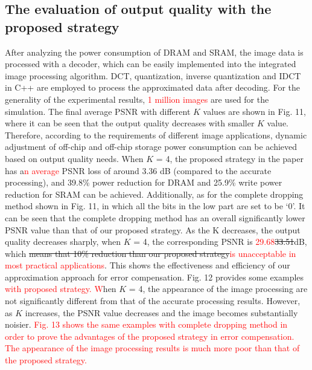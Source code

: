 \documentclass[lettersize,journal]{IEEEtran}
\begin{document}
\subsection{The evaluation of output quality with the proposed strategy}
After analyzing the power consumption of DRAM and SRAM, the image data is processed with a decoder, which can be easily implemented into the integrated image processing algorithm. DCT, quantization, inverse quantization and IDCT in C++ are employed to process the approximated data after decoding. For the generality of the experimental results, \textcolor{red}{1 million images} are used for the simulation. The final average PSNR with different $K$ values are shown in Fig. 11, where it can be seen that the output quality decreases with smaller $K$ value. Therefore, according to the requirements of different image applications, dynamic adjustment of off-chip and off-chip storage power consumption can be achieved based on output quality needs. When $K$ = 4, the proposed strategy in the paper has a\textcolor{red}{n average} PSNR loss of around 3.36 dB (compared to the accurate processing), and 39.8\% power reduction for DRAM and 25.9\% write power reduction for SRAM can be achieved. Additionally, as for the complete dropping method shown in Fig. 11, in which all the bits in the low part are set to be `0'. It can be seen that the complete dropping method has an overall significantly lower PSNR value than that of our proposed strategy. As the K decreases, the output quality decreases sharply, when $K$ = 4, the corresponding PSNR is \textcolor{red}{29.68}{\color{red}\sout{33.51}}dB, which {\color{red}\sout{means that 10\% reduction than our proposed strategy}}\textcolor{red}{is unacceptable in most practical applications}. This shows the effectiveness and efficiency of our approximation approach for error compensation. Fig. 12 provides some examples \textcolor{red}{with proposed strategy.} \textcolor{red}{W}hen $K$ = 4, the appearance of the image processing are not significantly different from that of the accurate processing results. However, as $K$ increases, the PSNR value decreases and the image becomes substantially noisier.
\textcolor{red}{Fig. 13 shows the same examples with complete dropping method in order to prove the advantages of the proposed strategy in error compensation. The appearance of the image processing results is much more poor than that of the proposed strategy.}
\end{document}
